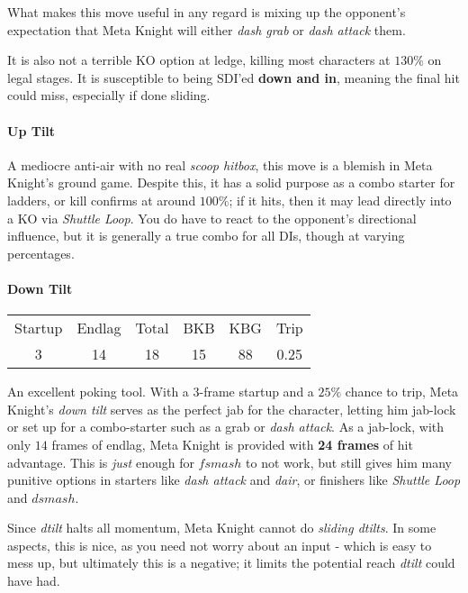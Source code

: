 What makes this move useful in any regard is mixing up the opponent's expectation that Meta Knight will either \textit{dash grab} or \textit{dash attack} them. 

It is also not a terrible KO option at ledge, killing most characters at $130\%$ on legal stages. It is susceptible to being SDI'ed \textbf{down and in}, meaning the final hit could miss, especially if done sliding.

\paragraph{Up Tilt}
A mediocre anti-air with no real \textit{scoop hitbox}, this move is a blemish in Meta Knight's ground game. Despite this, it has a solid purpose as a combo starter for ladders, or kill confirms at around $100\%$; if it hits, then it may lead directly into a KO via \textit{Shuttle Loop}. You do have to react to the opponent's directional influence, but it is generally a true combo for all DIs, though at varying percentages.

\paragraph{Down Tilt}
\begin{center}
	\begin{tabular}{| c  c  c | c  c  c |}
		\hline
		Startup	& Endlag & Total & BKB & KBG & Trip\\
		3	&	14	&	18	&	15	&	88	& 0.25\\
		\hline
	\end{tabular}
\end{center}
An excellent poking tool. With a 3-frame startup and a $25\%$ chance to trip, Meta Knight's \emph{down tilt} serves as the perfect jab for the character, letting him jab-lock or set up for a combo-starter such as a grab or \textit{dash attack}.
%
As a jab-lock, with only $14$ frames of endlag, Meta Knight is provided with \textbf{24 frames} of hit advantage. This is \textit{just} enough for $fsmash$ to not work, but still gives him many punitive options in starters like \textit{dash attack} and \textit{dair}, or finishers like \textit{Shuttle Loop} and $dsmash$.

Since \textit{dtilt} halts all momentum, Meta Knight cannot do \textit{sliding dtilts}. In some aspects, this is nice, as you need not worry about an input - which is easy to mess up, but ultimately this is a negative; it limits the potential reach \textit{dtilt} could have had.

